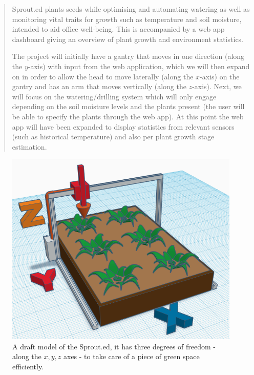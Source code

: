 \documentclass{article}
\begin{document}
 



\begin{abstract} 
Sprout.ed plants seeds while optimising and automating watering as well as monitoring vital traits for growth such as temperature and soil moisture, intended to aid office well-being. This is accompanied by a web app dashboard giving an overview of plant growth and environment statistics. 


The project will initially have a gantry that moves in one direction (along the $y$-axis) with input from the web application, which we will then expand on in order to allow the head to move laterally (along the $x$-axis) on the gantry and has an arm that moves vertically (along the $z$-axis). Next, we will focus on the watering/drilling system which will only engage depending on the soil moisture levels and the plants present (the user will be able to specify the plants through the web app). At this point the web app will have been expanded to display statistics from relevant sensors (such as historical temperature) and also per plant growth stage estimation.

\end{abstract} 

\label{sec:intro}
\begin{figure}[h!]
    \centering
    \includegraphics[width=1\linewidth]{figs/sproutie3d.png}
    \caption{A draft model of the Sprout.ed, it has three degrees of freedom - along the $x, y, z$ axes - to take care of a piece of green space efficiently.}
    \label{fig:sproutie3d}
\end{figure}
\end{document}
